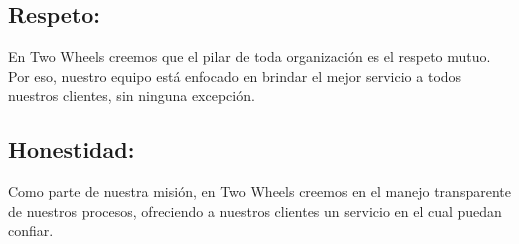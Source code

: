 \subsection{Respeto:}
En Two Wheels creemos que el pilar de toda organización es el respeto mutuo. Por eso, nuestro equipo está enfocado en brindar el mejor servicio a todos nuestros clientes, sin ninguna excepción.
\subsection{Honestidad:}
Como parte de nuestra misión, en Two Wheels creemos en el manejo transparente de nuestros procesos, ofreciendo a nuestros clientes un servicio en el cual puedan confiar.

